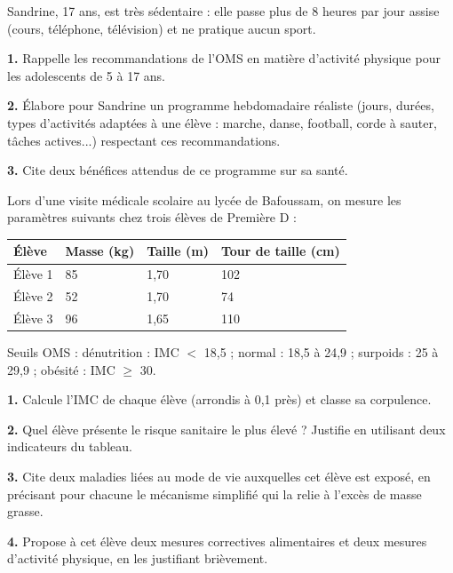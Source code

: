 \documentclass[11pt]{article}
\newcounter{popsec}
\newcounter{popsub}
\newcommand{\courssub}[1]{%
  \stepcounter{popsub}%
  \par\vspace{9pt}\noindent{\popxbold\fontsize{11.5}{13}\selectfont\color{popink}{\color{poporange}\thepopsec.\thepopsub}\hspace{6pt}#1}\par\nopagebreak\vspace{4pt}
}
\begin{document}
\begin{exercice}
Sandrine, 17 ans, est très sédentaire : elle passe plus de 8 heures par jour assise (cours, téléphone, télévision) et ne pratique aucun sport.

\textbf{1.} Rappelle les recommandations de l'OMS en matière d'activité physique pour les adolescents de 5 à 17 ans.

\textbf{2.} Élabore pour Sandrine un programme hebdomadaire réaliste (jours, durées, types d'activités adaptées à une élève : marche, danse, football, corde à sauter, tâches actives...) respectant ces recommandations.

\textbf{3.} Cite deux bénéfices attendus de ce programme sur sa santé.
\end{exercice}

\courssub{Je me prépare au Probatoire}

\begin{exercice}
Lors d'une visite médicale scolaire au lycée de Bafoussam, on mesure les paramètres suivants chez trois élèves de Première D :

\begin{center}
\begin{tabularx}{\linewidth}{|l|X|X|X|}
\hline
\rowcolor{popblueL} \textbf{Élève} & \textbf{Masse (kg)} & \textbf{Taille (m)} & \textbf{Tour de taille (cm)} \\
\hline
Élève 1 & 85 & 1,70 & 102 \\
\hline
Élève 2 & 52 & 1,70 & 74 \\
\hline
Élève 3 & 96 & 1,65 & 110 \\
\hline
\end{tabularx}
\end{center}

Seuils OMS : dénutrition : IMC $<$ 18,5 ; normal : 18,5 à 24,9 ; surpoids : 25 à 29,9 ; obésité : IMC $\geq$ 30.

\textbf{1.} Calcule l'IMC de chaque élève (arrondis à 0,1 près) et classe sa corpulence.

\textbf{2.} Quel élève présente le risque sanitaire le plus élevé ? Justifie en utilisant deux indicateurs du tableau.

\textbf{3.} Cite deux maladies liées au mode de vie auxquelles cet élève est exposé, en précisant pour chacune le mécanisme simplifié qui la relie à l'excès de masse grasse.

\textbf{4.} Propose à cet élève deux mesures correctives alimentaires et deux mesures d'activité physique, en les justifiant brièvement.
\end{exercice}
\end{document}
